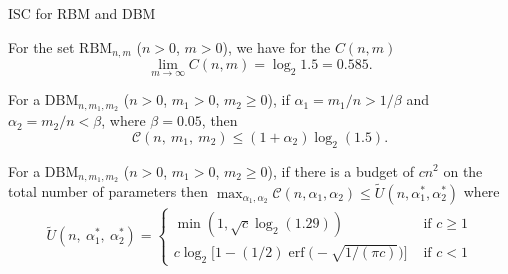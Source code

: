 \documentclass[8pt]{beamer}
\begin{document}
\begin{frame}[label={sec:orgc351d56}]{ISC for RBM and DBM}
\begin{corollary}[L=1, wide hidden layer]
For the set \(\mathrm{RBM}_{n,m}\) (\(n > 0\), \(m > 0\)), we have for the  \(C(n, m)\)
\[
\lim_{m \to \infty} C(n, m) = \log_2 1.5 = 0.585.
\]
\hfill \blacksquare
\label{org49aac17}
\end{corollary}
\begin{corollary}[L=2, layer 1 wide, layer 2 narrow]
For a \(\mathrm{DBM}_{n, m_1, m_2}\) (\(n > 0\), \(m_1 > 0\), \(m_2 \geq 0\)), if \(\alpha_1=m_1/n > 1/\beta\) and \(\alpha_2 = m_2/n <\beta\), where \(\beta = 0.05\), then
\[
\mathcal{C}\left(n,~m_1,~m_2\right) \leq\left(1+\alpha_2\right) \log _2(1.5). 
\]
\hfill \blacksquare
\label{org523335a}
\end{corollary}
\begin{corollary}
For a \(\mathrm{DBM}_{n, m_1, m_2}\) (\(n>0\), \(m_1>0\), \(m_2\geq0\)), if there is a budget of \(cn^2\) on the total number of parameters then \(\max _{\alpha_1, \alpha_2} \mathcal{C}\left(n, \alpha_1, \alpha_2\right) \leq \tilde{U}\left(n, \alpha_1^*, \alpha_2^*\right)\) where
\begin{align*}
\tilde{U}\left(n,~\alpha_1^*,~\alpha_2^*\right)= \begin{cases}\min \left(1, \sqrt{c} \log _2(1.29)\right) & \text { if } c \geq 1 \\ c \log_2 \big[1-(1/2) \operatorname{erf}\big(-\sqrt{1/ (\pi c)}\big) \big] & \text { if } c<1\end{cases}
\end{align*}
\hfill \blacksquare
\label{orga2415bf}
\end{corollary}
\end{frame}
\end{document}

